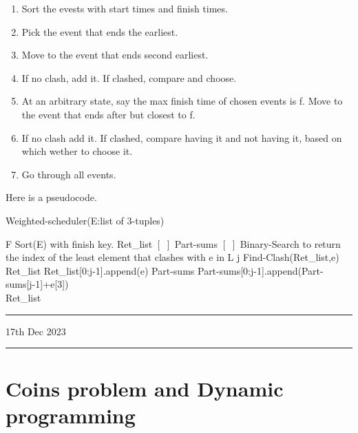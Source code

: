 \documentclass{myclass}
\begin{document}
\begin{enumerate}
    \item Sort the evests with start times and finish times.
    \item Pick the event that ends the earliest.
    \item Move to the event that ends second earliest.
    \item If no clash, add it. If clashed, compare and choose.
    \item At an arbitrary state, say the max finish time of chosen events is f. Move to the event that ends after but closest to f. 
    \item If no clash add it. If clashed, compare having it and not having it, based on which wether to choose it.
    \item Go through all events.
\end{enumerate}

Here is a pseudocode.

\begin{algorithm}
    \caption*{Weighted-scheduler(E:list of 3-tuples)}
    \begin{algorithmic}[1]
        \State F \ass Sort(E) with finish key.
        \State Ret\_list \ass $[\,\,]$
        \State Part-sums \ass $[\,\,]$
            \State Binary-Search to return the index of the least element that clashes with e in L
        \EndProcedure
            \State j \ass Find-Clash(Ret\_list,e) 
                \State Ret\_list \ass Ret\_list[0:j-1].append(e)
                \State Part-sums \ass Part-sums[0:j-1].append(Part-sums[j-1]+e[3])
            \EndIf
        \EndFor\\
         Ret\_list
    \end{algorithmic}
\end{algorithm}

\hrule
\vspace{-0.15cm}
\begin{flushleft}
    17th Dec 2023
\end{flushleft}
\vspace{-0.15cm}
\hrule

\section*{Coins problem and Dynamic programming}
\end{document}
